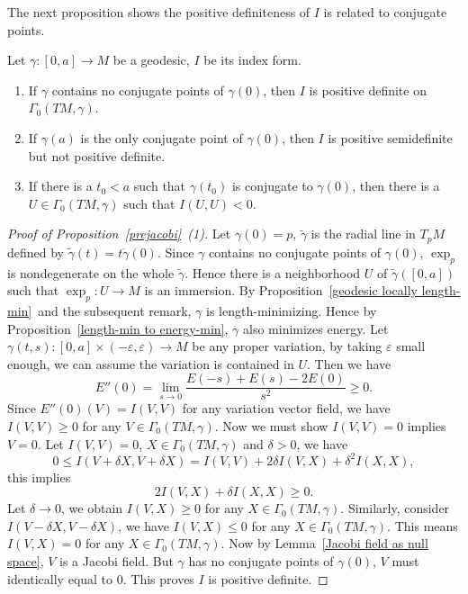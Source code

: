 The next proposition shows the positive definiteness of $I$ is related to conjugate points.
\begin{prop}\label{prejacobi}
    Let $\gamma:[0,a]\to M$ be a geodesic, $I$ be its index form.
    \begin{enumerate}[(1)]
        \item If $\gamma$ contains no conjugate points of $\gamma(0)$, then $I$ is positive definite on $\Gamma_0(TM,\gamma)$.
        \item If $\gamma(a)$ is the only conjugate point of $\gamma(0)$, then $I$ is positive semidefinite but not positive definite.
        \item If there is a $t_0<a$ such that $\gamma(t_0)$ is conjugate to $\gamma(0)$, then there is a $U\in\Gamma_0(TM,\gamma)$ such that $I(U,U)<0$. 
    \end{enumerate}
\end{prop}
\begin{proof}[Proof of Proposition~\ref{prejacobi}~(1)]
    Let $\gamma(0)=p$, $\tilde\gamma$ is the radial line in $T_pM$ defined by $\tilde\gamma(t)=t\dot\gamma(0)$.
    Since $\gamma$ contains no conjugate points of $\gamma(0)$, $\exp_p$ is nondegenerate on the whole $\tilde\gamma$.
    Hence there is a neighborhood $U$ of $\tilde\gamma([0,a])$ such that $\exp_p:U\to M$ is an immersion.
    By Proposition~\ref{geodesic locally length-min}~and the subsequent remark, $\gamma$ is length-minimizing.
    Hence by Proposition~\ref{length-min to energy-min}, $\gamma$ also minimizes energy.
    Let $\gamma(t,s):[0,a]\times(-\varepsilon,\varepsilon)\to M$ be any proper variation, by taking $\varepsilon$ small enough, we can assume the variation is contained in $U$.
    Then we have
    \[E''(0)=\lim_{s\to 0}\frac{E(-s)+E(s)-2E(0)}{s^2}\geq 0.\]
    Since $E''(0)(V)=I(V,V)$ for any variation vector field, we have $I(V,V)\geq 0$ for any $V\in\Gamma_0(TM,\gamma)$.
    Now we must show $I(V,V)=0$ implies $V=0$.
    Let $I(V,V)=0$, $X\in\Gamma_0(TM,\gamma)$ and $\delta>0$, we have
    \[0\leq I(V+\delta X,V+\delta X)=I(V,V)+2\delta I(V,X)+\delta^2I(X,X),\]
    this implies
    \[2I(V,X)+\delta I(X,X)\geq 0.\]
    Let $\delta\to 0$, we obtain $I(V,X)\geq 0$ for any $X\in\Gamma_0(TM,\gamma)$.
    Similarly, consider $I(V-\delta X,V-\delta X)$, we have $I(V,X)\leq 0$ for any $X\in\Gamma_0(TM,\gamma)$.
    This means $I(V,X)=0$ for any $X\in\Gamma_0(TM,\gamma)$.
    Now by Lemma~\ref{Jacobi field as null space}, $V$ is a Jacobi field.
    But $\gamma$ has no conjugate points of $\gamma(0)$, $V$ must identically equal to $0$.
    This proves $I$ is positive definite.
\end{proof}